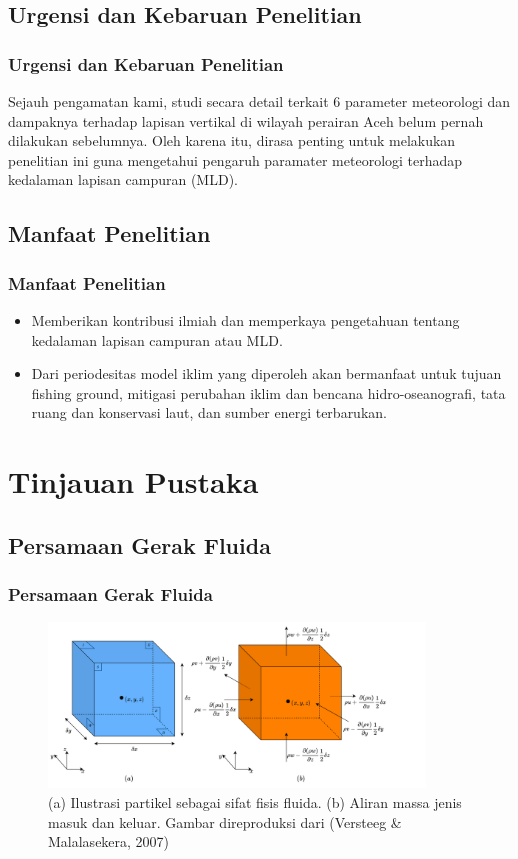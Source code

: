 \documentclass{beamer}
\begin{document}
\subsection{Urgensi dan Kebaruan Penelitian}
\begin{frame}
	\frametitle{Urgensi dan Kebaruan Penelitian}
	Sejauh pengamatan kami, studi secara detail terkait 6 parameter meteorologi dan dampaknya terhadap lapisan vertikal di wilayah perairan Aceh belum pernah dilakukan sebelumnya. Oleh karena itu, dirasa penting untuk melakukan penelitian ini guna mengetahui pengaruh paramater meteorologi terhadap kedalaman lapisan campuran (MLD).
\end{frame}

\subsection{Manfaat Penelitian}
\begin{frame}
	\frametitle{Manfaat Penelitian}
	\begin{itemize}
		\item Memberikan kontribusi ilmiah dan memperkaya pengetahuan tentang kedalaman lapisan campuran atau MLD.
		\item Dari periodesitas model iklim yang diperoleh akan bermanfaat untuk tujuan fishing ground, mitigasi perubahan iklim dan bencana hidro-oseanografi, tata ruang dan konservasi laut, dan sumber energi terbarukan.
	\end{itemize}
\end{frame}

\section{Tinjauan Pustaka}
\subsection{Persamaan Gerak Fluida}
\begin{frame}
	\frametitle{Persamaan Gerak Fluida}
	\begin{figure}[H]
		\centering
		\includegraphics[width=10cm]{cube.png}
		\caption{(a) Ilustrasi partikel sebagai sifat fisis fluida. (b) Aliran massa jenis masuk dan keluar. Gambar direproduksi dari (Versteeg \& Malalasekera, 2007)}
		\label{fig:cube}
	\end{figure}
\end{frame}
\end{document}
